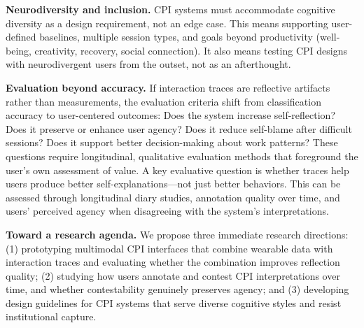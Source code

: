 \documentclass[10pt]{article}
\begin{document}
\textbf{Neurodiversity and inclusion.} CPI systems must accommodate cognitive diversity as a design requirement, not an edge case. This means supporting user-defined baselines, multiple session types, and goals beyond productivity (well-being, creativity, recovery, social connection). It also means testing CPI designs with neurodivergent users from the outset, not as an afterthought.

\textbf{Evaluation beyond accuracy.} If interaction traces are reflective artifacts rather than measurements, the evaluation criteria shift from classification accuracy to user-centered outcomes: Does the system increase self-reflection? Does it preserve or enhance user agency? Does it reduce self-blame after difficult sessions? Does it support better decision-making about work patterns? These questions require longitudinal, qualitative evaluation methods that foreground the user's own assessment of value. A key evaluative question is whether traces help users produce better self-explanations---not just better behaviors. This can be assessed through longitudinal diary studies, annotation quality over time, and users' perceived agency when disagreeing with the system's interpretations.

\textbf{Toward a research agenda.} We propose three immediate research directions: (1) prototyping multimodal CPI interfaces that combine wearable data with interaction traces and evaluating whether the combination improves reflection quality; (2) studying how users annotate and contest CPI interpretations over time, and whether contestability genuinely preserves agency; and (3) developing design guidelines for CPI systems that serve diverse cognitive styles and resist institutional capture.
\end{document}

